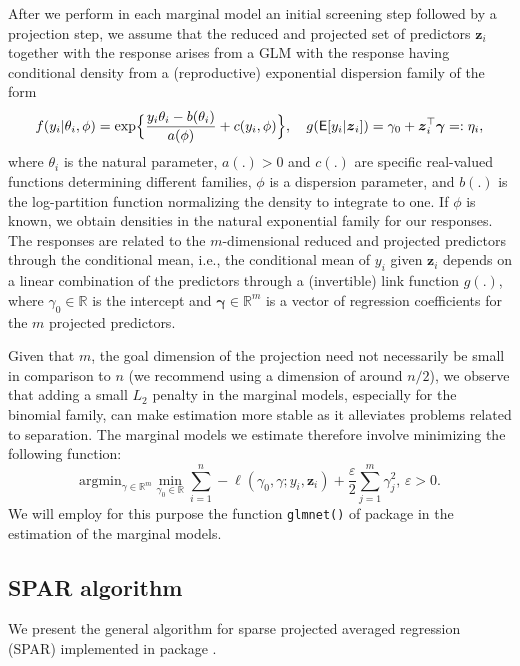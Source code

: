 \documentclass[
  article]{jss}
\begin{document}
After we perform in each marginal model an initial screening step
followed by a projection step, we assume that the reduced and projected
set of predictors \(\boldsymbol{z}_i\) together with the response arises
from a GLM with the response having conditional density from a
(reproductive) exponential dispersion family of the form
\begin{align*}\label{eqn:y_density}
  f(y_i|\theta_i,\phi) = \exp\Bigl\{\frac{y_i\theta_i- b(\theta_i)}{a(\phi)} + c(y_i,\phi)\Bigr\},
  \quad
    g(\mathsf{E}[y_i|\boldsymbol{z}_i]) = \gamma_0 + \boldsymbol{z}_i^\top\boldsymbol{\gamma}=:\eta_i,
\end{align*} where \(\theta_i\) is the natural parameter, \(a(.)>0\) and
\(c(.)\) are specific real-valued functions determining different
families, \(\phi\) is a dispersion parameter, and \(b(.)\) is the
log-partition function normalizing the density to integrate to one. If
\(\phi\) is known, we obtain densities in the natural exponential family
for our responses. The responses are related to the \(m\)-dimensional
reduced and projected predictors through the conditional mean, i.e., the
conditional mean of \(y_i\) given \({\boldsymbol{z}}_i\) depends on a
linear combination of the predictors through a (invertible) link
function \(g(.)\), where \(\gamma_0\in\mathbb{R}\) is the intercept and
\(\boldsymbol{\gamma}\in\mathbb{R}^m\) is a vector of regression
coefficients for the \(m\) projected predictors.

Given that \(m\), the goal dimension of the projection need not
necessarily be small in comparison to \(n\) (we recommend using a
dimension of around \(n/2\)), we observe that adding a small \(L_2\)
penalty in the marginal models, especially for the binomial family, can
make estimation more stable as it alleviates problems related to
separation. The marginal models we estimate therefore involve minimizing
the following function: \[
 \text{argmin}_{{\gamma}\in\mathbb{R}^m}\min_{\gamma_0\in\mathbb{R}}  \sum_{i=1}^n -\ell(\gamma_0, \gamma;y_i,\boldsymbol{z}_i) + \frac{\varepsilon}{2}\sum_{j=1}^m{\gamma}_j^2, \, \varepsilon > 0.
\] We will employ for this purpose the function \texttt{glmnet()} of
package  \citep{glmnet2023} in the estimation of the
marginal models.

\subsection{SPAR algorithm}\label{sec-algo}

We present the general algorithm for sparse projected averaged
regression (SPAR) implemented in package .
\end{document}
